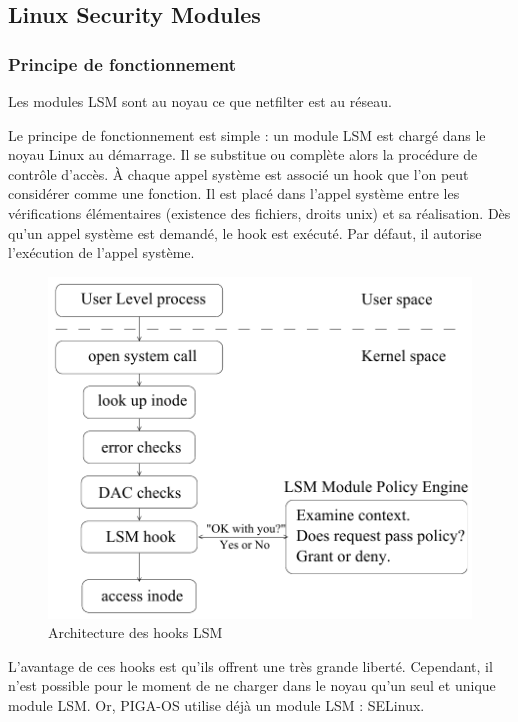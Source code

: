 \documentclass[pdftex,a4paper,titlepage,11pt,openright]{article}
\begin{document}
\subsection{Linux Security Modules}

\subsubsection{Principe de fonctionnement}

Les modules LSM sont au noyau ce que netfilter est au réseau.

Le principe de fonctionnement est simple : un module LSM est chargé dans le noyau Linux au démarrage. Il se substitue ou complète alors la procédure de contrôle d'accès. \`A chaque appel système est associé un hook que l'on peut considérer comme une fonction. Il est placé dans l'appel système entre les vérifications élémentaires (existence des fichiers, droits unix) et sa réalisation. Dès qu'un appel système est demandé, le hook est exécuté. Par défaut, il autorise l'exécution de l'appel système.

\begin{figure}[hb]
	\centering
	\includegraphics[scale=0.45]{attachements/lsm1.png}
	\caption{Architecture des hooks LSM \cite{LSMINTRO}}
\end{figure}

L'avantage de ces hooks est qu'ils offrent une très grande liberté. Cependant, il n'est possible pour le moment de ne charger dans le noyau qu'un seul et unique module LSM. Or, PIGA-OS utilise déjà un module LSM : SELinux.
\end{document}
